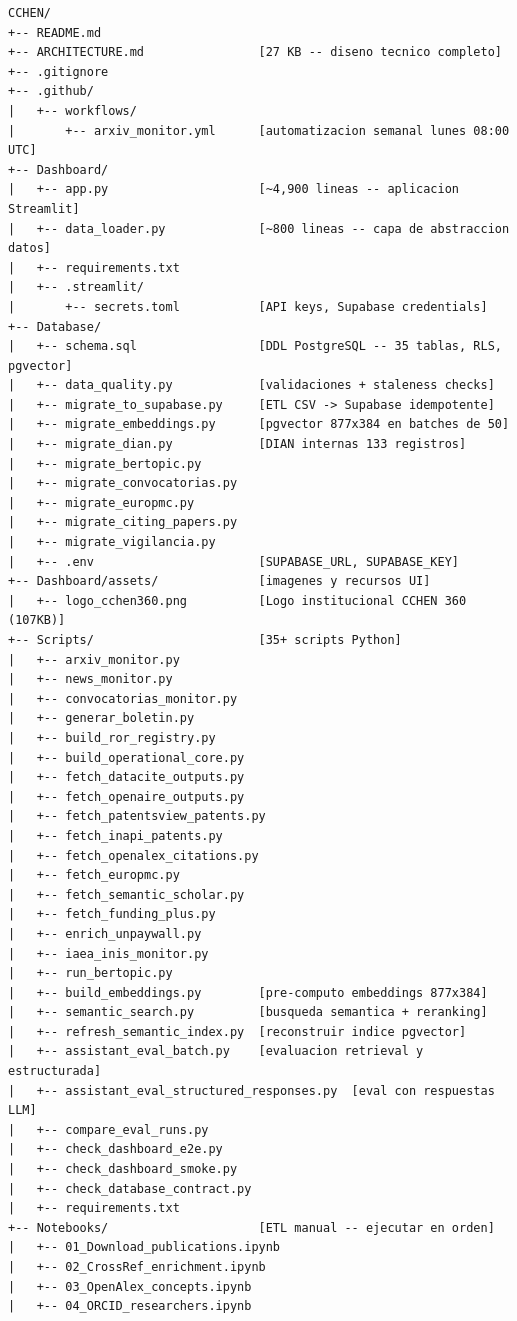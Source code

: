 \documentclass[12pt,a4paper]{report}
\begin{document}
\begin{lstlisting}[caption={Arbol de directorios del proyecto}, style=bashstyle]
CCHEN/
+-- README.md
+-- ARCHITECTURE.md                [27 KB -- diseno tecnico completo]
+-- .gitignore
+-- .github/
|   +-- workflows/
|       +-- arxiv_monitor.yml      [automatizacion semanal lunes 08:00 UTC]
+-- Dashboard/
|   +-- app.py                     [~4,900 lineas -- aplicacion Streamlit]
|   +-- data_loader.py             [~800 lineas -- capa de abstraccion datos]
|   +-- requirements.txt
|   +-- .streamlit/
|       +-- secrets.toml           [API keys, Supabase credentials]
+-- Database/
|   +-- schema.sql                 [DDL PostgreSQL -- 35 tablas, RLS, pgvector]
|   +-- data_quality.py            [validaciones + staleness checks]
|   +-- migrate_to_supabase.py     [ETL CSV -> Supabase idempotente]
|   +-- migrate_embeddings.py      [pgvector 877x384 en batches de 50]
|   +-- migrate_dian.py            [DIAN internas 133 registros]
|   +-- migrate_bertopic.py
|   +-- migrate_convocatorias.py
|   +-- migrate_europmc.py
|   +-- migrate_citing_papers.py
|   +-- migrate_vigilancia.py
|   +-- .env                       [SUPABASE_URL, SUPABASE_KEY]
+-- Dashboard/assets/              [imagenes y recursos UI]
|   +-- logo_cchen360.png          [Logo institucional CCHEN 360 (107KB)]
+-- Scripts/                       [35+ scripts Python]
|   +-- arxiv_monitor.py
|   +-- news_monitor.py
|   +-- convocatorias_monitor.py
|   +-- generar_boletin.py
|   +-- build_ror_registry.py
|   +-- build_operational_core.py
|   +-- fetch_datacite_outputs.py
|   +-- fetch_openaire_outputs.py
|   +-- fetch_patentsview_patents.py
|   +-- fetch_inapi_patents.py
|   +-- fetch_openalex_citations.py
|   +-- fetch_europmc.py
|   +-- fetch_semantic_scholar.py
|   +-- fetch_funding_plus.py
|   +-- enrich_unpaywall.py
|   +-- iaea_inis_monitor.py
|   +-- run_bertopic.py
|   +-- build_embeddings.py        [pre-computo embeddings 877x384]
|   +-- semantic_search.py         [busqueda semantica + reranking]
|   +-- refresh_semantic_index.py  [reconstruir indice pgvector]
|   +-- assistant_eval_batch.py    [evaluacion retrieval y estructurada]
|   +-- assistant_eval_structured_responses.py  [eval con respuestas LLM]
|   +-- compare_eval_runs.py
|   +-- check_dashboard_e2e.py
|   +-- check_dashboard_smoke.py
|   +-- check_database_contract.py
|   +-- requirements.txt
+-- Notebooks/                     [ETL manual -- ejecutar en orden]
|   +-- 01_Download_publications.ipynb
|   +-- 02_CrossRef_enrichment.ipynb
|   +-- 03_OpenAlex_concepts.ipynb
|   +-- 04_ORCID_researchers.ipynb

\end{lstlisting}
\end{document}
